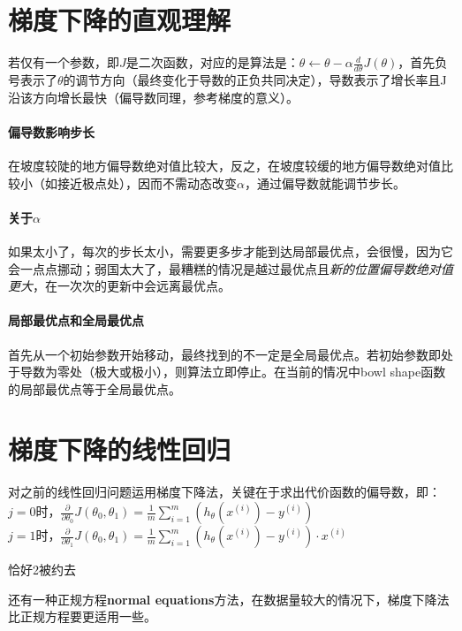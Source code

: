 \documentclass[../main.tex]{subfiles}
\begin{document}
\section{梯度下降的直观理解}
若仅有一个参数，即\(J\)是二次函数，对应的是算法是：\(θ ← θ - α\frac{d}{dθ}J(θ)\)，首先负号表示了\(θ\)的调节方向（最终变化于导数的正负共同决定），导数表示了增长率且J沿该方向增长最快（偏导数同理，参考梯度的意义）。
\paragraph{偏导数影响步长}在坡度较陡的地方偏导数绝对值比较大，反之，在坡度较缓的地方偏导数绝对值比较小（如接近极点处），因而不需动态改变\(α\)，通过偏导数就能调节步长。
\paragraph{关于\(α\)}如果太小了，每次的步长太小，需要更多步才能到达局部最优点，会很慢，因为它会一点点挪动；弱国太大了，最糟糕的情况是越过最优点且\textit{新的位置偏导数绝对值更大}，在一次次的更新中会远离最优点。
\paragraph{局部最优点和全局最优点}首先从一个初始参数开始移动，最终找到的不一定是全局最优点。若初始参数即处于导数为零处（极大或极小），则算法立即停止。在当前的情况中bowl shape函数的局部最优点等于全局最优点。

\section{梯度下降的线性回归}
对之前的线性回归问题运用梯度下降法，关键在于求出代价函数的偏导数，即：
\(j=0\)时，\(\frac{∂}{∂θ_0}J(θ_0,θ_1) = \frac{1}{m}\sum\limits_{i=1}^m(h_θ(x^{(i)})-y^{(i)})\)\\
\(j=1\)时，\(\frac{∂}{∂θ_1}J(θ_0,θ_1) = \frac{1}{m}\sum\limits_{i=1}^m(h_θ(x^{(i)})-y^{(i)})·x^{(i)}\)

\begin{remark}
    恰好2被约去
\end{remark}

还有一种正规方程\textbf{normal equations}方法，在数据量较大的情况下，梯度下降法比正规方程要更适用一些。
\end{document}
